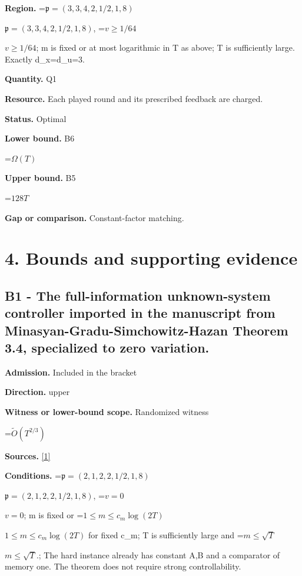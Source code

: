 \documentclass[10pt,a4paper]{article}
\newcommand{\AtlasMath}[1]{\par\begingroup\centering\setbox0=\hbox{$\displaystyle #1$}\ifdim\wd0>1.4\linewidth\typeout{ATLAS WIDE FORMULA: \the\wd0}\fi\ifdim\wd0>\linewidth\resizebox{\linewidth}{!}{\box0}\else\box0\fi\par\endgroup}
\newcommand{\AtlasInlineMath}[1]{\begingroup\setbox0=\hbox{$#1$}\ifdim\wd0>.4\linewidth\endgroup\AtlasMath{#1}\else\endgroup$#1$\fi}
\begin{document}
\textbf{Region.} \AtlasInlineMath{\mathfrak p=(3,3,4,2,1/2,1,8)}, \AtlasInlineMath{v\ge1/64}; m is fixed or at most logarithmic in T as above; T is sufficiently large. Exactly d\_x=d\_u=3.



\textbf{Quantity.} Q1



\textbf{Resource.} Each played round and its prescribed feedback are charged.



\textbf{Status.} Optimal



\textbf{Lower bound.} B6



\AtlasMath{\Omega(T)}


\textbf{Upper bound.} B5



\AtlasMath{128T}


\textbf{Gap or comparison.} Constant-factor matching.



\section{4. Bounds and supporting evidence}


\subsection{B1 - The full-information unknown-system controller imported in the manuscript from Minasyan-Gradu-Simchowitz-Hazan Theorem 3.4, specialized to zero variation.}


\textbf{Admission.} Included in the bracket



\textbf{Direction.} upper



\textbf{Witness or lower-bound scope.} Randomized witness



\AtlasMath{\widetilde O(T^{2/3})}


\textbf{Sources.} \href{https://github.com/WU-Wendao/Colombo/blob/main/colombo_sensorium/Complexity_altas/data/sources/colombo/Q6/manuscript.pdf}{[1]}



\textbf{Conditions.} \AtlasInlineMath{\mathfrak p=(2,1,2,2,1/2,1,8)}, \AtlasInlineMath{v=0}; m is fixed or \AtlasInlineMath{1\le m\le c_m\log(2T)} for fixed c\_m; T is sufficiently large and \AtlasInlineMath{m\le\sqrt T}.; The hard instance already has constant A,B and a comparator of memory one. The theorem does not require strong controllability.
\end{document}
